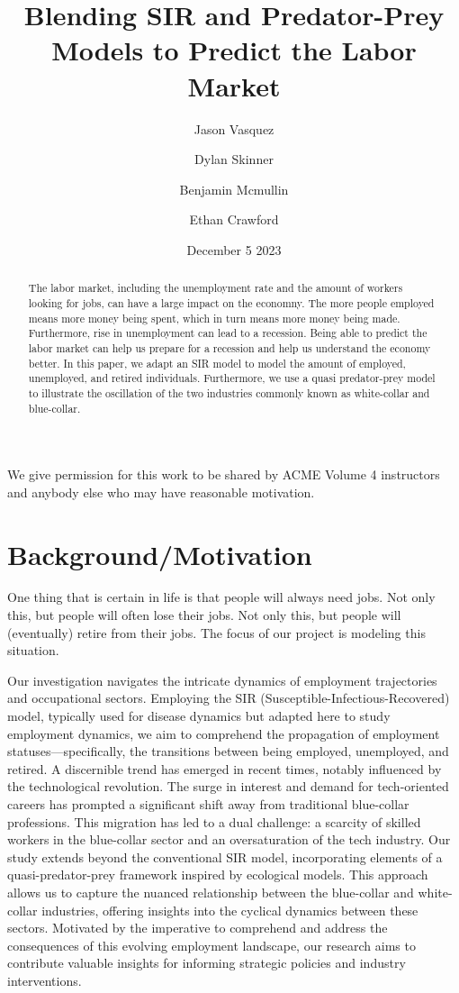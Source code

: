 \documentclass{article}
\title{Blending SIR and Predator-Prey Models to Predict the Labor Market}
\author{Jason Vasquez \and Dylan Skinner \and Benjamin Mcmullin \and Ethan Crawford}
\date{December 5 2023}
\begin{document}
\maketitle

We give permission for this work to be shared by ACME Volume 4 instructors and anybody else who may have reasonable motivation.

\begin{abstract}

The labor market, including the unemployment rate and the amount of workers looking for jobs, can have a large impact on the economny.
The more people employed means more money being spent, which in turn means more money being made. 
Furthermore, rise in unemployment can lead to a recession. Being able to predict the labor market can help us prepare for a recession and help us understand the economy better.
In this paper, we adapt an SIR model to model the amount of employed, unemployed, and retired individuals.
Furthermore, we use a quasi predator-prey model to illustrate the oscillation of the two industries commonly known as white-collar and blue-collar.

\end{abstract}

\section{Background/Motivation}

One thing that is certain in life is that people will always need jobs. Not only this, but people 
will often lose their jobs. Not only this, but people will (eventually) retire from their jobs.
The focus of our project is modeling this situation.

Our investigation navigates the intricate dynamics of employment trajectories and occupational sectors. 
Employing the SIR (Susceptible-Infectious-Recovered) model, typically used for disease dynamics but adapted 
here to study employment dynamics, we aim to comprehend the propagation of employment statuses—specifically, 
the transitions between being employed, unemployed, and retired. A discernible trend has emerged in recent times, 
notably influenced by the technological revolution. The surge in interest and demand for tech-oriented careers 
has prompted a significant shift away from traditional blue-collar professions. This migration has led to a 
dual challenge: a scarcity of skilled workers in the blue-collar sector and an oversaturation of the tech 
industry. Our study extends beyond the conventional SIR model, incorporating elements of a quasi-predator-prey 
framework inspired by ecological models. This approach allows us to capture the nuanced relationship between 
the blue-collar and white-collar industries, offering insights into the cyclical dynamics between these sectors. 
Motivated by the imperative to comprehend and address the consequences of this evolving employment landscape, 
our research aims to contribute valuable insights for informing strategic policies and industry interventions.
\end{document}
